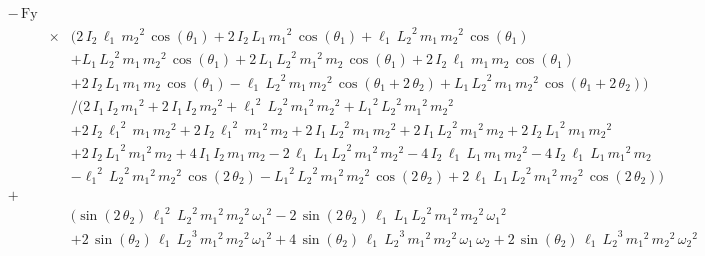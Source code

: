 \documentclass[a4paper,11pt]{jsarticle}
\begin{document}
\begin{align*}
  & -\,\mathrm{Fy} & &
  \\
    & & \times &
    \Bigg(
        2\,I_{2}\,\ell_{1}\,{m_{2}}^2\,\cos\left(\theta_1\right)+
        2\,I_{2}\,L_1\,{m_{1}}^2\,\cos\left(\theta_1\right)+
        \ell_{1}\,{L_2}^2\,m_{1}\,{m_{2}}^2\,\cos\left(\theta_1\right)
        \\ & & &+
        L_1\,{L_2}^2\,m_{1}\,{m_{2}}^2\,\cos\left(\theta_1\right)+
        2\,L_1\,{L_2}^2\,{m_{1}}^2\,m_{2}\,\cos\left(\theta_1\right)+
        2\,I_{2}\,\ell_{1}\,m_{1}\,m_{2}\,\cos\left(\theta_1\right)
        \\ & & &+
        2\,I_{2}\,L_1\,m_{1}\,m_{2}\,\cos\left(\theta_1\right)-
        \ell_{1}\,{L_2}^2\,m_{1}\,{m_{2}}^2\,\cos\left(\theta_1+
        2\,\theta_2\right)+
        L_1\,{L_2}^2\,m_{1}\,{m_{2}}^2\,\cos\left(\theta_1+
        2\,\theta_2\right)
    \Bigg)
    \\
    & & &\Bigg/ 
    \Bigg(
      2\,I_{1}\,I_{2}\,{m_{1}}^2+
      2\,I_{1}\,I_{2}\,{m_{2}}^2+
      {\ell_{1}}^2\,{L_2}^2\,{m_{1}}^2\,{m_{2}}^2+
      {L_1}^2\,{L_2}^2\,{m_{1}}^2\,{m_{2}}^2
      \\ & & &+
      2\,I_{2}\,{\ell_{1}}^2\,m_{1}\,{m_{2}}^2+
      2\,I_{2}\,{\ell_{1}}^2\,{m_{1}}^2\,m_{2}+
      2\,I_{1}\,{L_2}^2\,m_{1}\,{m_{2}}^2+
      2\,I_{1}\,{L_2}^2\,{m_{1}}^2\,m_{2}+
      2\,I_{2}\,{L_1}^2\,m_{1}\,{m_{2}}^2
      \\ & & &+
      2\,I_{2}\,{L_1}^2\,{m_{1}}^2\,m_{2}+
      4\,I_{1}\,I_{2}\,m_{1}\,m_{2}-
      2\,\ell_{1}\,L_1\,{L_2}^2\,{m_{1}}^2\,{m_{2}}^2-
      4\,I_{2}\,\ell_{1}\,L_1\,m_{1}\,{m_{2}}^2-
      4\,I_{2}\,\ell_{1}\,L_1\,{m_{1}}^2\,m_{2}
      \\ & & &-
      {\ell_{1}}^2\,{L_2}^2\,{m_{1}}^2\,{m_{2}}^2\,\cos\left(2\,\theta_2\right)-
      {L_1}^2\,{L_2}^2\,{m_{1}}^2\,{m_{2}}^2\,\cos\left(2\,\theta_2\right)+
      2\,\ell_{1}\,L_1\,{L_2}^2\,{m_{1}}^2\,{m_{2}}^2\,\cos\left(2\,\theta_2\right)
    \Bigg)
  \\
  & + & &
  \\
    & & &\Bigg(
      \sin\left(2\,\theta_2\right)\,{\ell_{1}}^2\,{L_2}^2\,{m_{1}}^2\,{m_{2}}^2\,{\omega _{1}}^2-
      2\,\sin\left(2\,\theta_2\right)\,\ell_{1}\,L_1\,{L_2}^2\,{m_{1}}^2\,{m_{2}}^2\,{\omega _{1}}^2
      \\ & & &+
      2\,\sin\left(\theta_2\right)\,\ell_{1}\,{L_2}^3\,{m_{1}}^2\,{m_{2}}^2\,{\omega _{1}}^2+
      4\,\sin\left(\theta_2\right)\,\ell_{1}\,{L_2}^3\,{m_{1}}^2\,{m_{2}}^2\,\omega _{1}\,\omega _{2}+
      2\,\sin\left(\theta_2\right)\,\ell_{1}\,{L_2}^3\,{m_{1}}^2\,{m_{2}}^2\,{\omega _{2}}^2

\end{align*}
\end{document}
